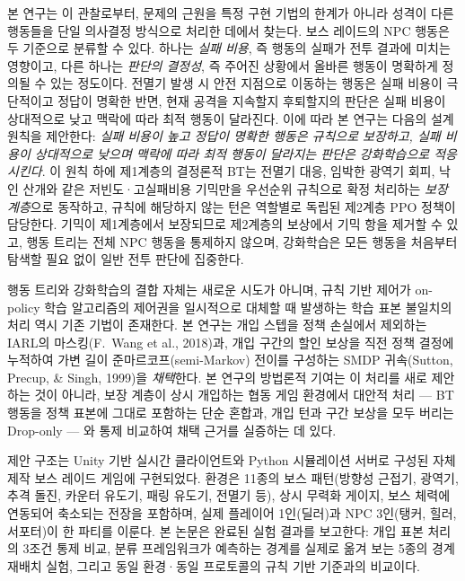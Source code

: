 \documentclass[12pt]{article}      %
\begin{document}
본 연구는 이 관찰로부터, 문제의 근원을 특정 구현 기법의 한계가 아니라 성격이
다른 행동들을 단일 의사결정 방식으로 처리한 데에서 찾는다. 보스 레이드의 NPC
행동은 두 기준으로 분류할 수 있다. 하나는 \emph{실패 비용}, 즉 행동의 실패가
전투 결과에 미치는 영향이고, 다른 하나는 \emph{판단의 결정성}, 즉 주어진 상황에서
올바른 행동이 명확하게 정의될 수 있는 정도이다. 전멸기 발생 시 안전 지점으로
이동하는 행동은 실패 비용이 극단적이고 정답이 명확한 반면, 현재 공격을 지속할지
후퇴할지의 판단은 실패 비용이 상대적으로 낮고 맥락에 따라 최적 행동이 달라진다.
이에 따라 본 연구는 다음의 설계 원칙을 제안한다: \emph{실패 비용이 높고 정답이
명확한 행동은 규칙으로 보장하고, 실패 비용이 상대적으로 낮으며 맥락에 따라 최적
행동이 달라지는 판단은 강화학습으로 적응시킨다}. 이 원칙 하에 제1계층의 결정론적
BT는 전멸기 대응, 임박한 광역기 회피, 낙인 산개와 같은 저빈도·고실패비용
기믹만을 우선순위 규칙으로 확정 처리하는 \emph{보장 계층}으로 동작하고, 규칙에
해당하지 않는 턴은 역할별로 독립된 제2계층 PPO 정책이 담당한다. 기믹이
제1계층에서 보장되므로 제2계층의 보상에서 기믹 항을 제거할 수 있고, 행동 트리는
전체 NPC 행동을 통제하지 않으며, 강화학습은 모든 행동을 처음부터 탐색할 필요
없이 일반 전투 판단에 집중한다.

행동 트리와 강화학습의 결합 자체는 새로운 시도가 아니며, 규칙 기반 제어가
on-policy 학습 알고리즘의 제어권을 일시적으로 대체할 때 발생하는 학습 표본
불일치의 처리 역시 기존 기법이 존재한다. 본 연구는 개입 스텝을 정책 손실에서
제외하는 IARL의 마스킹(F.~Wang et al., 2018)과, 개입 구간의 할인 보상을 직전
정책 결정에 누적하여 가변 길이 준마르코프(semi-Markov) 전이를 구성하는 SMDP
귀속(Sutton, Precup, \& Singh, 1999)을 \emph{채택}한다. 본 연구의 방법론적
기여는 이 처리를 새로 제안하는 것이 아니라, 보장 계층이 상시 개입하는 협동 게임
환경에서 대안적 처리 --- BT 행동을 정책 표본에 그대로 포함하는 단순 혼합과, 개입
턴과 구간 보상을 모두 버리는 Drop-only --- 와 통제 비교하여 채택 근거를 실증하는
데 있다.

제안 구조는 Unity 기반 실시간 클라이언트와 Python 시뮬레이션 서버로 구성된 자체
제작 보스 레이드 게임에 구현되었다. 환경은 11종의 보스 패턴(방향성 근접기, 광역기,
추격 돌진, 카운터 유도기, 패링 유도기, 전멸기 등), 상시 무력화 게이지, 보스 체력에
연동되어 축소되는 전장을 포함하며, 실제 플레이어 1인(딜러)과 NPC 3인(탱커,
힐러, 서포터)이 한 파티를 이룬다. 본 논문은 완료된 실험 결과를 보고한다: 개입
표본 처리의 3조건 통제 비교, 분류 프레임워크가 예측하는 경계를 실제로 옮겨 보는
5종의 경계 재배치 실험, 그리고 동일 환경·동일 프로토콜의 규칙 기반 기준과의
비교이다.
\end{document}
